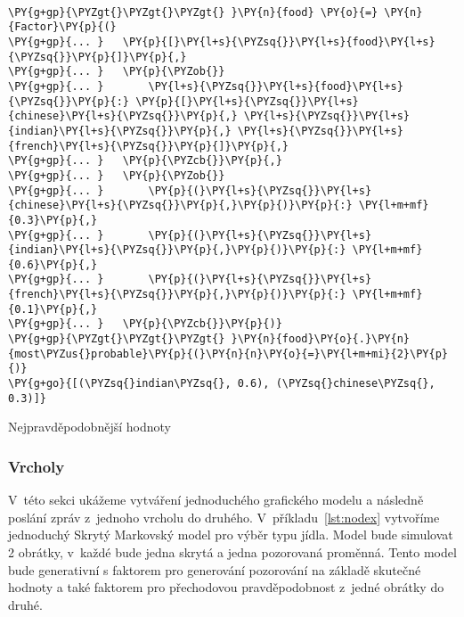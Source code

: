 \begin{example}
\begin{Verbatim}[commandchars=\\\{\}]

\PY{g+gp}{\PYZgt{}\PYZgt{}\PYZgt{} }\PY{n}{food} \PY{o}{=} \PY{n}{Factor}\PY{p}{(}
\PY{g+gp}{... }   \PY{p}{[}\PY{l+s}{\PYZsq{}}\PY{l+s}{food}\PY{l+s}{\PYZsq{}}\PY{p}{]}\PY{p}{,}
\PY{g+gp}{... }   \PY{p}{\PYZob{}}
\PY{g+gp}{... }       \PY{l+s}{\PYZsq{}}\PY{l+s}{food}\PY{l+s}{\PYZsq{}}\PY{p}{:} \PY{p}{[}\PY{l+s}{\PYZsq{}}\PY{l+s}{chinese}\PY{l+s}{\PYZsq{}}\PY{p}{,} \PY{l+s}{\PYZsq{}}\PY{l+s}{indian}\PY{l+s}{\PYZsq{}}\PY{p}{,} \PY{l+s}{\PYZsq{}}\PY{l+s}{french}\PY{l+s}{\PYZsq{}}\PY{p}{]}\PY{p}{,}
\PY{g+gp}{... }   \PY{p}{\PYZcb{}}\PY{p}{,}
\PY{g+gp}{... }   \PY{p}{\PYZob{}}
\PY{g+gp}{... }       \PY{p}{(}\PY{l+s}{\PYZsq{}}\PY{l+s}{chinese}\PY{l+s}{\PYZsq{}}\PY{p}{,}\PY{p}{)}\PY{p}{:} \PY{l+m+mf}{0.3}\PY{p}{,}
\PY{g+gp}{... }       \PY{p}{(}\PY{l+s}{\PYZsq{}}\PY{l+s}{indian}\PY{l+s}{\PYZsq{}}\PY{p}{,}\PY{p}{)}\PY{p}{:} \PY{l+m+mf}{0.6}\PY{p}{,}
\PY{g+gp}{... }       \PY{p}{(}\PY{l+s}{\PYZsq{}}\PY{l+s}{french}\PY{l+s}{\PYZsq{}}\PY{p}{,}\PY{p}{)}\PY{p}{:} \PY{l+m+mf}{0.1}\PY{p}{,}
\PY{g+gp}{... }   \PY{p}{\PYZcb{}}\PY{p}{)}
\PY{g+gp}{\PYZgt{}\PYZgt{}\PYZgt{} }\PY{n}{food}\PY{o}{.}\PY{n}{most\PYZus{}probable}\PY{p}{(}\PY{n}{n}\PY{o}{=}\PY{l+m+mi}{2}\PY{p}{)}
\PY{g+go}{[(\PYZsq{}indian\PYZsq{}, 0.6), (\PYZsq{}chinese\PYZsq{}, 0.3)]}
\end{Verbatim}
\caption{Nejpravděpodobnější hodnoty}
\label{lst:facmop}
\end{example}


\subsubsection{Vrcholy}

V~této sekci ukážeme vytváření jednoduchého grafického modelu a následně poslání zpráv z~jednoho vrcholu do druhého.
V~příkladu~\ref{lst:nodex} vytvoříme jednoduchý Skrytý Markovský model pro výběr typu jídla.
Model bude simulovat 2 obrátky, v~každé bude jedna skrytá a jedna pozorovaná proměnná.
Tento model bude generativní s faktorem pro generování pozorování na základě skutečné hodnoty a také faktorem pro přechodovou pravděpodobnost z~jedné obrátky do druhé.

